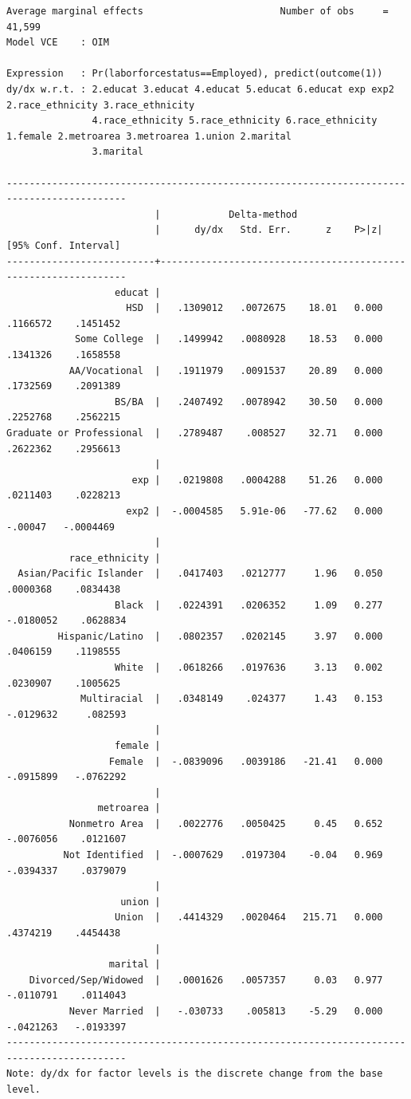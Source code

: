 \documentclass[
]{book}
\begin{document}
\begin{verbatim}
Average marginal effects                        Number of obs     =     41,599
Model VCE    : OIM

Expression   : Pr(laborforcestatus==Employed), predict(outcome(1))
dy/dx w.r.t. : 2.educat 3.educat 4.educat 5.educat 6.educat exp exp2 2.race_ethnicity 3.race_ethnicity
               4.race_ethnicity 5.race_ethnicity 6.race_ethnicity 1.female 2.metroarea 3.metroarea 1.union 2.marital
               3.marital

-------------------------------------------------------------------------------------------
                          |            Delta-method
                          |      dy/dx   Std. Err.      z    P>|z|     [95% Conf. Interval]
--------------------------+----------------------------------------------------------------
                   educat |
                     HSD  |   .1309012   .0072675    18.01   0.000     .1166572    .1451452
            Some College  |   .1499942   .0080928    18.53   0.000     .1341326    .1658558
           AA/Vocational  |   .1911979   .0091537    20.89   0.000     .1732569    .2091389
                   BS/BA  |   .2407492   .0078942    30.50   0.000     .2252768    .2562215
Graduate or Professional  |   .2789487    .008527    32.71   0.000     .2622362    .2956613
                          |
                      exp |   .0219808   .0004288    51.26   0.000     .0211403    .0228213
                     exp2 |  -.0004585   5.91e-06   -77.62   0.000      -.00047   -.0004469
                          |
           race_ethnicity |
  Asian/Pacific Islander  |   .0417403   .0212777     1.96   0.050     .0000368    .0834438
                   Black  |   .0224391   .0206352     1.09   0.277    -.0180052    .0628834
         Hispanic/Latino  |   .0802357   .0202145     3.97   0.000     .0406159    .1198555
                   White  |   .0618266   .0197636     3.13   0.002     .0230907    .1005625
             Multiracial  |   .0348149    .024377     1.43   0.153    -.0129632     .082593
                          |
                   female |
                  Female  |  -.0839096   .0039186   -21.41   0.000    -.0915899   -.0762292
                          |
                metroarea |
           Nonmetro Area  |   .0022776   .0050425     0.45   0.652    -.0076056    .0121607
          Not Identified  |  -.0007629   .0197304    -0.04   0.969    -.0394337    .0379079
                          |
                    union |
                   Union  |   .4414329   .0020464   215.71   0.000     .4374219    .4454438
                          |
                  marital |
    Divorced/Sep/Widowed  |   .0001626   .0057357     0.03   0.977    -.0110791    .0114043
           Never Married  |   -.030733    .005813    -5.29   0.000    -.0421263   -.0193397
-------------------------------------------------------------------------------------------
Note: dy/dx for factor levels is the discrete change from the base level.



\end{verbatim}
\end{document}
